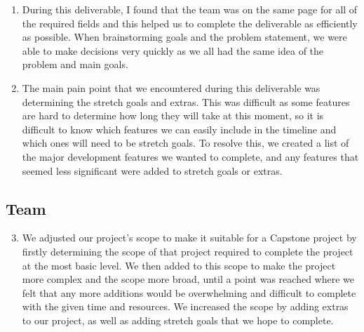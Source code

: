 \documentclass{article}
\begin{document}
\begin{enumerate}
    \item During this deliverable, I found that the team was on the same page for all of the required fields and this helped us to complete the deliverable as efficiently as possible. When brainstorming goals and the problem statement, we were able to make decisions very quickly as we all had the same idea of the problem and main goals. 
    \item The main pain point that we encountered during this deliverable was determining the stretch goals and extras. This was difficult as some features are hard to determine how long they will take at this moment, so it is difficult to know which features we can easily include in the timeline and which ones will need to be stretch goals. To resolve this, we created a list of the major development features we wanted to complete, and any features that seemed less significant were added to stretch goals or extras. 
\end{enumerate}  

\subsection*{Team}

\begin{enumerate}
\setcounter{enumi}{2}
    \item We adjusted our project’s scope to make it suitable for a Capstone project by firstly determining the scope of that project required to complete the project at the most basic level. We then added to this scope to make the project more complex and the scope more broad, until a point was reached where we felt that any more additions would be overwhelming and difficult to complete with the given time and resources. We increased the scope by adding extras to our project, as well as adding stretch goals that we hope to complete.
 
\end{enumerate} 
\end{document}
